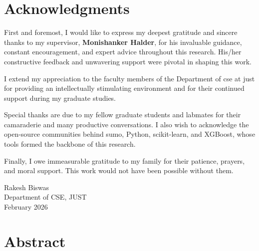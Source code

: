 \documentclass{thesis-library}
\begin{document}
\chapter*{Acknowledgments}

First and foremost, I would like to express my deepest gratitude and sincere thanks to
my supervisor, \textbf{Monishanker Halder}, for his invaluable guidance, constant
encouragement, and expert advice throughout this research. His/her constructive feedback
and unwavering support were pivotal in shaping this work.

I extend my appreciation to the faculty members of the Department of
\Gls{cse} at \Gls{just} for providing an intellectually stimulating environment and for
their continued support during my graduate studies.

Special thanks are due to my fellow graduate students and labmates for their camaraderie
and many productive conversations. I also wish to acknowledge the open-source communities
behind \Gls{sumo}, Python, scikit-learn, and XGBoost, whose tools formed the backbone of
this research.

Finally, I owe immeasurable gratitude to my family for their patience, prayers, and moral
support. This work would not have been possible without them.

\vspace{1.5cm}
\begin{flushright}
Rakesh Biswas \\
Department of CSE, JUST \\
February 2026
\end{flushright}

\newpage
\listofabbreviations

\tableofcontents
\newpage
\listoffigures
\newpage
\listoftables

\chapter*{Abstract}
\end{document}
